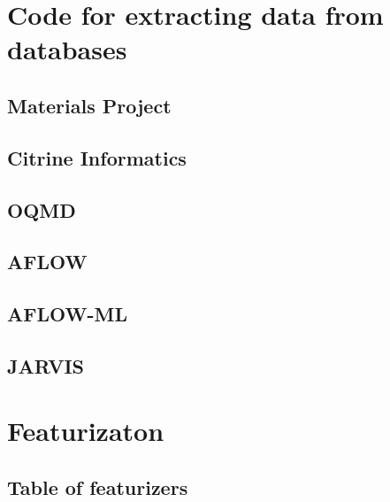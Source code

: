 \chapter{Code for extracting data from databases}

\section{Materials Project}



\section{Citrine Informatics}



\section{OQMD}



\section{AFLOW}



\section{AFLOW-ML}



\section{JARVIS}



\chapter{Featurizaton}

\section{Table of featurizers}

